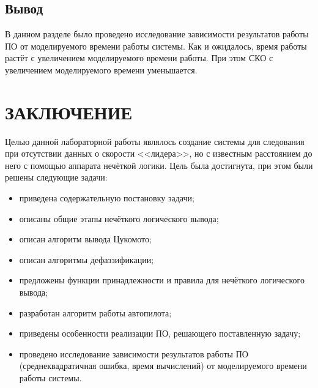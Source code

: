 \documentclass[12pt]{report}
\begin{document}
\section*{Вывод}
В данном разделе было проведено исследование зависимости результатов работы ПО от моделируемого времени работы системы. Как и ожидалось, время работы растёт с увеличением моделируемого времени работы. При этом СКО с увеличением моделируемого времени уменьшается.

\chapter*{ЗАКЛЮЧЕНИЕ}
Целью данной лабораторной работы являлось создание системы для следования при отсутствии данных о скорости <<лидера>>, но с известным расстоянием до него с помощью аппарата нечёткой логики. 
Цель была достигнута, при этом были решены следующие задачи:
\begin{itemize}
    \item приведена содержательную постановку задачи;
    \item описаны общие этапы нечёткого логического вывода;
    \item описан алгоритм вывода Цукомото;
    \item описан алгоритмы дефаззификации;
    \item предложены функции принадлежности и правила для нечёткого логического вывода;
    \item разработан алгоритм работы автопилота;
    \item приведены особенности реализации ПО, решающего поставленную задачу;
    \item проведено исследование зависимости результатов работы ПО (среднеквадратичная ошибка, время вычислений) от моделируемого времени работы системы.
\end{itemize}

\printbibliography[title={СПИСОК ИСПОЛЬЗОВАННЫХ\\ ИСТОЧНИКОВ}]
\end{document}
